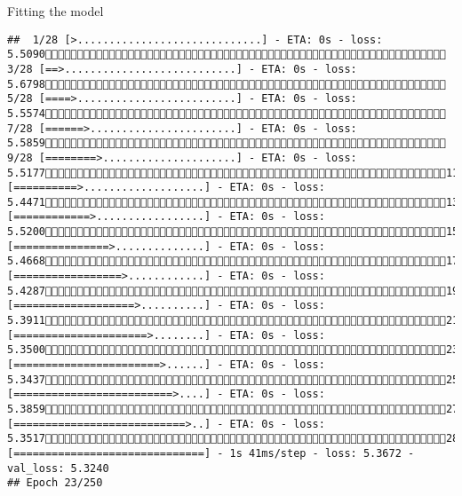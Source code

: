 \documentclass[
  ignorenonframetext,
]{beamer}
\begin{document}
\begin{frame}[fragile]{Fitting the model}
\begin{verbatim}
##  1/28 [>.............................] - ETA: 0s - loss: 5.5090 3/28 [==>...........................] - ETA: 0s - loss: 5.6798 5/28 [====>.........................] - ETA: 0s - loss: 5.5574 7/28 [======>.......................] - ETA: 0s - loss: 5.5859 9/28 [========>.....................] - ETA: 0s - loss: 5.517711/28 [==========>...................] - ETA: 0s - loss: 5.447113/28 [============>.................] - ETA: 0s - loss: 5.520015/28 [===============>..............] - ETA: 0s - loss: 5.466817/28 [=================>............] - ETA: 0s - loss: 5.428719/28 [===================>..........] - ETA: 0s - loss: 5.391121/28 [=====================>........] - ETA: 0s - loss: 5.350023/28 [=======================>......] - ETA: 0s - loss: 5.343725/28 [=========================>....] - ETA: 0s - loss: 5.385927/28 [===========================>..] - ETA: 0s - loss: 5.351728/28 [==============================] - 1s 41ms/step - loss: 5.3672 - val_loss: 5.3240
## Epoch 23/250

\end{verbatim}
\end{frame}
\end{document}

